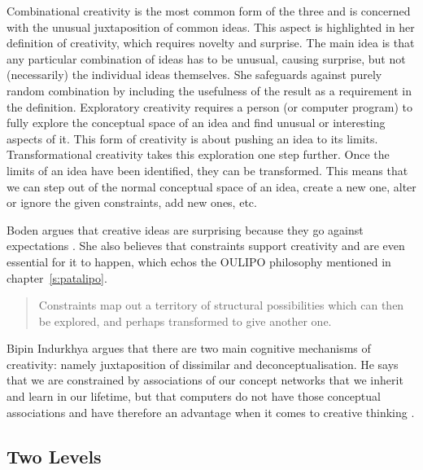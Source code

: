 Combinational creativity is the most common form of the three and is concerned with the unusual juxtaposition of common ideas. This aspect is highlighted in her definition of creativity, which requires novelty and surprise. The main idea is that any particular combination of ideas has to be unusual, causing surprise, but not (necessarily) the individual ideas themselves. She safeguards against purely random combination by including the usefulness of the result as a requirement in the definition. Exploratory creativity requires a person (or computer program) to fully explore the conceptual space of an idea and find unusual or interesting aspects of it. This form of creativity is about pushing an idea to its limits. Transformational creativity takes this exploration one step further. Once the limits of an idea have been identified, they can be transformed. This means that we can step out of the normal conceptual space of an idea, create a new one, alter or ignore the given constraints, add new ones, etc.

Boden argues that creative ideas are surprising because they go against expectations \autocite*{Boden2003}. She also believes that constraints support creativity and are even essential for it to happen, which echos the \ac{OULIPO} philosophy mentioned in chapter~\ref{s:patalipo}.

\begin{quotation}
  Constraints map out a territory of structural possibilities which can then be explored, and perhaps transformed to give another one. 
\end{quotation}

Bipin Indurkhya argues that there are two main cognitive mechanisms of creativity: namely juxtaposition of dissimilar and deconceptualisation. He says that we are constrained by associations of our concept networks that we inherit and learn in our lifetime, but that computers do not have those conceptual associations and have therefore an advantage when it comes to creative thinking \autocite*{Indurkhya1997}.


\subsection{Two Levels}
\label{s:pandh}

